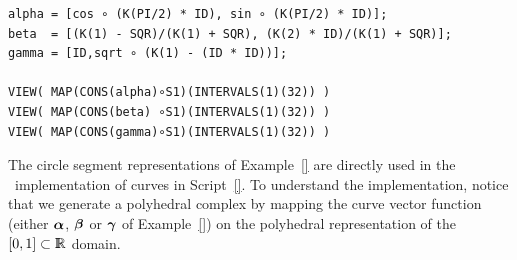 \begin{coding}[Algebraic computation of FE = $\delta_1$]
{\begin{condition}
\begin{lstlisting}[language=JuliaLocal, style=julia, mathescape=true]
alpha = [cos ∘ (K(PI/2) * ID), sin ∘ (K(PI/2) * ID)];
beta  = [(K(1) - SQR)/(K(1) + SQR), (K(2) * ID)/(K(1) + SQR)]; 
gamma = [ID,sqrt ∘ (K(1) - (ID * ID))];

VIEW( MAP(CONS(alpha)∘S1)(INTERVALS(1)(32)) )
VIEW( MAP(CONS(beta) ∘S1)(INTERVALS(1)(32)) )
VIEW( MAP(CONS(gamma)∘S1)(INTERVALS(1)(32)) )
\end{lstlisting}
\end{condition}

The circle segment representations of Example~\ref{} are directly
used in the \pl\ implementation of curves in
Script~\ref{}.  To understand the implementation, notice
that we generate a polyhedral complex by mapping the curve vector
function (either ${\mbox{\boldmath $\alpha$}}$, ${\mbox{\boldmath $\beta$}}$ or ${\mbox{\boldmath $\gamma$}}$ of
Example~\ref{}) on the polyhedral representation of the
$[0,1]\subset\mathbb{I\!\!R}$ domain.




%
%
%



}
\end{coding}
